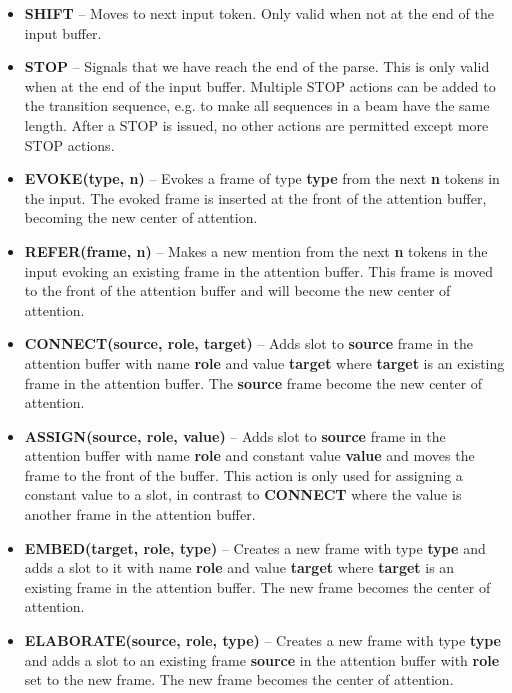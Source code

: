 \documentclass[11pt,a4paper]{article}
\begin{document}
\begin{itemize}
  \item {\bf SHIFT} -- Moves to next input token. Only valid when not at the
        end of the input buffer.
  \item {\bf STOP} -- Signals that we have reach the end of the parse. This is
        only valid when at the end of the input buffer. Multiple STOP actions
        can be added to the transition sequence, e.g. to make all sequences in a
        beam have the same length. After a STOP is issued, no other actions are
        permitted except more STOP actions.
  \item {\bf EVOKE(type, n)} -- Evokes a frame of type {\bf type} from
        the next {\bf n} tokens in the input. The evoked frame is inserted at the front of the attention
        buffer, becoming the new center of attention.
  \item {\bf REFER(frame, n)} -- Makes a new mention from the next {\bf n} tokens
        in the input evoking an existing frame in the attention buffer. This
        frame is moved to the front of the attention buffer and will become the
        new center of attention.
  \item {\bf CONNECT(source, role, target)} -- Adds slot to {\bf source} frame
        in the attention buffer with name {\bf role} and value {\bf target}
        where {\bf target} is an existing frame in the attention buffer. The
        {\bf source} frame become the new center of attention.
  \item {\bf ASSIGN(source, role, value)} -- Adds slot to {\bf source} frame in
        the attention buffer with name {\bf role} and constant value {\bf value}
        and moves the frame to the front of the buffer. This action
        is only used for assigning a constant value to a slot, in contrast to
        {\bf CONNECT} where the value is another frame in the attention buffer.
  \item {\bf EMBED(target, role, type)} -- Creates a new frame with
        type {\bf type} and adds a slot to it with name {\bf role} and value
        {\bf target} where {\bf target} is an existing frame in the attention
        buffer. The new frame becomes the center of attention.
  \item {\bf ELABORATE(source, role, type)} -- Creates a new frame with type
        {\bf type} and adds a slot to an existing frame {\bf source} in the
        attention buffer with {\bf role} set to the new frame. The new frame
        becomes the center of attention.
\end{itemize}
\end{document}
